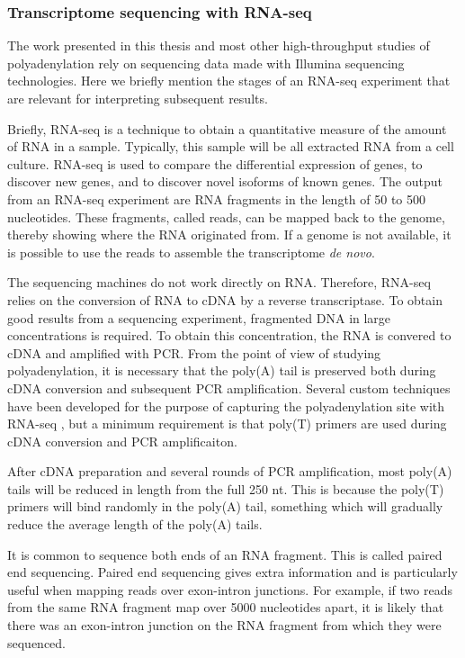 %
\subsubsection{Transcriptome sequencing with RNA-seq}
The work presented in this thesis and most other high-throughput studies of
polyadenylation rely on sequencing data made with Illumina sequencing
technologies. Here we briefly mention the stages of an RNA-seq
experiment that are relevant for interpreting subsequent results.

Briefly, RNA-seq is a technique to obtain a quantitative measure of the amount
of RNA in a sample. Typically, this sample will be all extracted RNA from a
cell culture. RNA-seq is used to compare the differential expression of
genes, to discover new genes, and to discover novel isoforms of known genes.
The output from an RNA-seq experiment are RNA fragments in the length of
50 to 500 nucleotides. These fragments, called reads, can be mapped back to the
genome, thereby showing where the RNA originated from. If a genome is not
available, it is possible to use the reads to assemble the transcriptome
\textit{de novo}.

The sequencing machines do not work directly on RNA. Therefore, RNA-seq relies
on the conversion of RNA to cDNA by a reverse transcriptase. To obtain good
results from a sequencing experiment, fragmented DNA in large concentrations is
required. To obtain this concentration, the RNA is convered to cDNA and
amplified with PCR. From the point of view of studying polyadenylation,
it is necessary that the poly(A) tail is preserved both during cDNA conversion
and subsequent PCR amplification. Several custom techniques have been developed
for the purpose of capturing the polyadenylation site with RNA-seq
\cite{ozsolak_comprehensive_2010, derti_quantitative_2012}, but a minimum
requirement is that poly(T) primers are used during cDNA conversion and PCR
amplificaiton.

After cDNA preparation and several rounds of PCR amplification, most poly(A)
tails will be reduced in length from the full 250 nt. This is because the
poly(T) primers will bind randomly in the poly(A) tail, something which will
gradually reduce the average length of the poly(A) tails.

It is common to sequence both ends of an RNA fragment. This is called paired
end sequencing. Paired end sequencing gives extra information and is
particularly useful when mapping reads over exon-intron junctions. For example,
if two reads from the same RNA fragment map over 5000 nucleotides apart, it is
likely that there was an exon-intron junction on the RNA fragment from which
they were sequenced.

